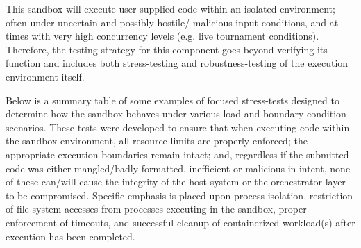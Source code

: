 \documentclass[12pt,a4paper]{report}
\begin{document}
This sandbox will execute user-supplied code within an isolated environment; often under uncertain and possibly hostile/ malicious input conditions, and at times with very high concurrency levels (e.g. live tournament conditions). Therefore, the testing strategy for this component goes beyond verifying its function and includes both stress-testing and robustness-testing of the execution environment itself.

Below is a summary table of some examples of focused stress-tests designed to determine how the sandbox behaves under various load and boundary condition scenarios. These tests were developed to ensure that when executing code within the sandbox environment, all resource limits are properly enforced; the appropriate execution boundaries remain intact; and, regardless if the submitted code was either mangled/badly formatted, inefficient or malicious in intent, none of these can/will cause the integrity of the host system or the orchestrator layer to be compromised. Specific emphasis is placed upon process isolation, restriction of file-system accesses from processes executing in the sandbox, proper enforcement of timeouts, and successful cleanup of containerized workload(s) after execution has been completed.
\end{document}
